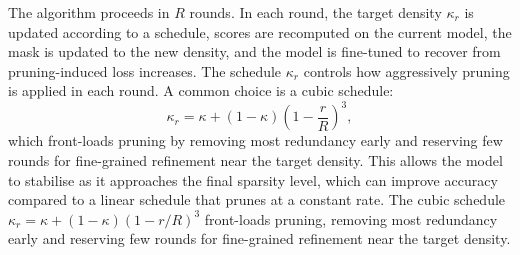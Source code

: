 The algorithm proceeds in $R$ rounds.  In each round, the target density $\kappa_r$ is updated according to a schedule, scores are recomputed on the current model, the mask is updated to the new density, and the model is fine-tuned to recover from pruning-induced loss increases.  The schedule $\kappa_r$ controls how aggressively pruning is applied in each round.  A common choice is a cubic schedule:
\begin{equation}
	\kappa_r = \kappa + (1 - \kappa)\left(1 - \frac{r}{R}\right)^3,
\end{equation}
which front-loads pruning by removing most redundancy early and reserving few rounds for fine-grained refinement near the target density.  This allows the model to stabilise as it approaches the final sparsity level, which can improve accuracy compared to a linear schedule that prunes at a constant rate.
The cubic schedule $\kappa_r = \kappa + (1-\kappa)(1 - r/R)^3$ front-loads
pruning, removing most redundancy early and reserving few rounds for
fine-grained refinement near the target density.

%
%
%

